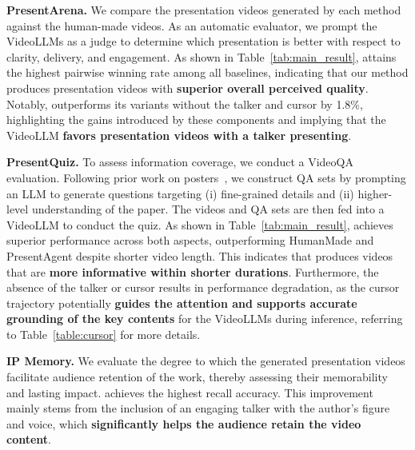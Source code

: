 \vspace{-0.4\baselineskip} 
\textbf{PresentArena.} We compare the presentation videos generated by each method against the human-made videos. As an automatic evaluator, we prompt the VideoLLMs as a judge to determine which presentation is better with respect to clarity, delivery, and engagement. As shown in Table~\ref{tab:main_result}, {\agent} attains the highest pairwise winning rate among all baselines, indicating that our method produces presentation videos with \textbf{superior overall perceived quality}. Notably, {\agent} outperforms its variants without the talker and cursor by 1.8\%, highlighting the gains introduced by these components and implying that the VideoLLM \textbf{favors presentation videos with a talker presenting}.


\vspace{-0.4\baselineskip} 
\textbf{PresentQuiz.} To assess information coverage, we conduct a VideoQA evaluation. Following prior work on posters~\cite{pang2025paper2poster}, we construct QA sets by prompting an LLM to generate questions targeting (i) fine-grained details and (ii) higher-level understanding of the paper. The videos and QA sets are then fed into a VideoLLM to conduct the quiz.
As shown in Table~\ref{tab:main_result}, {\agent} achieves superior performance across both aspects, outperforming HumanMade and PresentAgent despite shorter video length. This indicates that {\agent} produces videos that are \textbf{more informative within shorter durations}. Furthermore, the absence of the talker or cursor results in performance degradation, as the cursor trajectory  potentially \textbf{guides the attention and supports accurate grounding of the key contents} for the VideoLLMs during inference, referring to Table~\ref{table:cursor} for more details.

\vspace{-0.4\baselineskip} 
\textbf{IP Memory.} We evaluate the degree to which the generated presentation videos facilitate audience retention of the work, thereby assessing their memorability and lasting impact. {\agent} achieves the highest recall accuracy. This improvement mainly stems from the inclusion of an engaging talker with the author’s figure and voice, which \textbf{significantly helps the audience retain the video content}.


